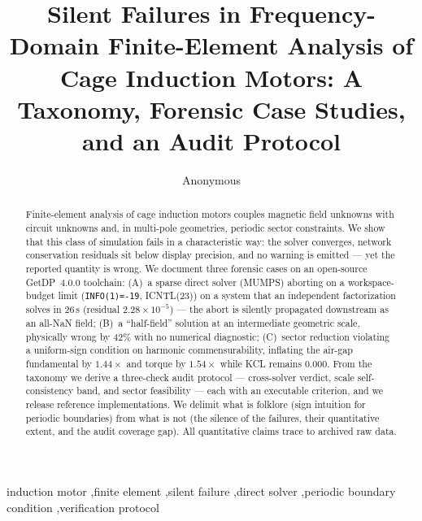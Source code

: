 \documentclass[preprint,12pt]{elsarticle}
\begin{document}
\begin{frontmatter}
\title{Silent Failures in Frequency-Domain Finite-Element Analysis of
Cage Induction Motors: A Taxonomy, Forensic Case Studies, and an Audit
Protocol}
\author[a]{Anonymous}
\begin{abstract}
Finite-element analysis of cage induction motors couples magnetic field
unknowns with circuit unknowns and, in multi-pole geometries, periodic
sector constraints. We show that this class of simulation fails in a
characteristic way: the solver converges, network conservation residuals sit below
display precision, and no warning is emitted --- yet the reported quantity
is wrong. We document three forensic cases on an open-source GetDP~4.0.0
toolchain: (A)~a sparse direct solver (MUMPS) aborting on a workspace-budget
limit (\texttt{INFO(1)=-19}, ICNTL(23)) on a system that an independent
factorization solves in 26\,s (residual $2.28\times10^{-5}$) --- the
abort is silently propagated downstream as an all-NaN field; (B)~a ``half-field''
solution at an intermediate geometric scale, physically wrong by 42\% with
no numerical diagnostic; (C)~sector reduction violating a uniform-sign
condition on harmonic commensurability, inflating the air-gap fundamental
by $1.44\times$ and torque by $1.54\times$ while KCL remains $0.000$. From the taxonomy we derive a
three-check audit protocol --- cross-solver verdict, scale
self-consistency band, and sector feasibility --- each with an executable
criterion, and we release reference implementations. We delimit what is
folklore (sign intuition for periodic boundaries) from what is not (the
silence of the failures, their quantitative extent, and the audit
coverage gap). All quantitative claims trace to archived raw data.
\end{abstract}
\begin{keyword}
induction motor \sep finite element \sep silent failure \sep direct
solver \sep periodic boundary condition \sep verification protocol
\end{keyword}
\end{frontmatter}
\end{document}
